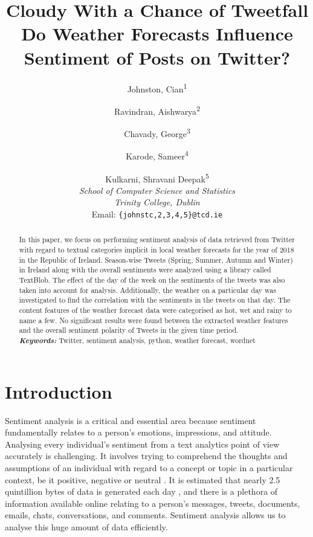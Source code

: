 \documentclass[a4paper,10pt]{article}
\begin{document}
    \title{Cloudy With a Chance of Tweetfall \\ \large{Do Weather Forecasts Influence Sentiment of Posts on Twitter?}}
    \author{
        Johnston, Cian\textsuperscript{1}
        \and
        Ravindran, Aishwarya\textsuperscript{2}
        \and
        Chavady, George\textsuperscript{3}
        \and
        Karode, Sameer\textsuperscript{4}
        \and
        Kulkarni, Shravani Deepak\textsuperscript{5} \\
        \textit{School of Computer Science and Statistics} \\
        \textit{Trinity College, Dublin} \\
        Email: \texttt{\{johnstc,2,3,4,5\}@tcd.ie} \\
    }

    \maketitle

    \begin{abstract}
     In this paper, we focus on performing sentiment analysis of data retrieved from Twitter with regard to textual categories implicit in local weather forecasts for the year of 2018 in the Republic of Ireland. Season-wise Tweets (Spring, Summer, Autumn and Winter) in Ireland along with the overall sentiments were analyzed using a library called TextBlob. The effect of the day of the week on the sentiments of the tweets was also taken into account for analysis. Additionally, the weather on a particular day was investigated to find the correlation with the sentiments in the tweets on that day. The content features of the weather forecast data were categorised as hot, wet and rainy to name a few. No significant results were found between the extracted weather features and the overall sentiment polarity of Tweets in the given time period.
    \\
    \textbf{\textit{Keywords:}} Twitter, sentiment analysis, python, weather forecast, wordnet
    \end{abstract}

    \section{Introduction}

    Sentiment analysis is a critical and essential area because sentiment fundamentally relates to a person’s emotions, impressions, and attitude. Analysing every individual’s sentiment from a text analytics point of view accurately is challenging. It involves trying to comprehend the thoughts and assumptions of an individual with regard to a concept or topic in a particular context, be it positive, negative or neutral . It is estimated that nearly 2.5 quintillion bytes of data is generated each day , and there is a plethora of information available online relating to a person’s messages, tweets, documents, emails, chats, conversations, and comments. Sentiment analysis allows us to analyse this huge amount of data efficiently.
\end{document}
